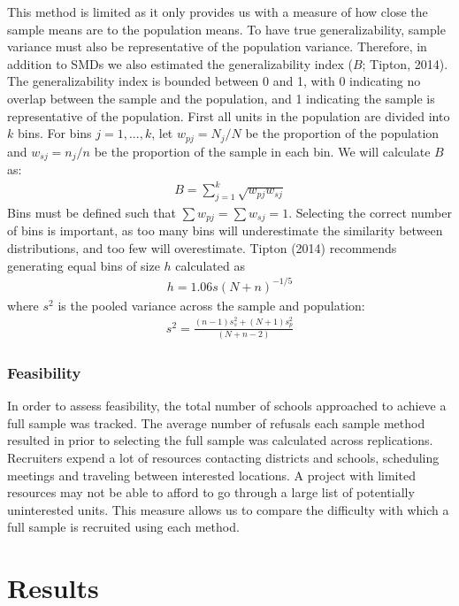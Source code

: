 \documentclass[man,floatsintext]{apa6}
\theoremstyle{definition}
\theoremstyle{definition}
\theoremstyle{definition}
\theoremstyle{remark}
\begin{document}
This method is limited as it only provides us with a measure of how
close the sample means are to the population means. To have true
generalizability, sample variance must also be representative of the
population variance. Therefore, in addition to SMDs we also estimated
the generalizability index (\(B\); Tipton, 2014). The generalizability
index is bounded between 0 and 1, with 0 indicating no overlap between
the sample and the population, and 1 indicating the sample is
representative of the population. First all units in the population are
divided into \(k\) bins. For bins \(j = 1,...,k\), let
\(w_{pj} = N_j/N\) be the proportion of the population and
\(w_{sj} = n_j/n\) be the proportion of the sample in each bin. We will
calculate \(B\) as: \begin{align}
  B = \sum^k_{j=1}\sqrt{w_{pj}w_{sj}}
\end{align} Bins must be defined such that
\(\sum{w_{pj}} = \sum{w_{sj}} = 1\). Selecting the correct number of
bins is important, as too many bins will underestimate the similarity
between distributions, and too few will overestimate. Tipton (2014)
recommends generating equal bins of size \(h\) calculated as
\begin{align}
  h = 1.06s(N+n)^{-1/5}
\end{align} where \(s^2\) is the pooled variance across the sample and
population: \begin{align}
  s^2 = \frac{(n - 1)s^2_s + (N + 1)s^2_p}{(N + n - 2)}
\end{align}

\hypertarget{feasibility}{%
\subsubsection{Feasibility}\label{feasibility}}

In order to assess feasibility, the total number of schools approached
to achieve a full sample was tracked. The average number of refusals
each sample method resulted in prior to selecting the full sample was
calculated across replications. Recruiters expend a lot of resources
contacting districts and schools, scheduling meetings and traveling
between interested locations. A project with limited resources may not
be able to afford to go through a large list of potentially uninterested
units. This measure allows us to compare the difficulty with which a
full sample is recruited using each method.

\hypertarget{results}{%
\section{Results}\label{results}}
\end{document}

